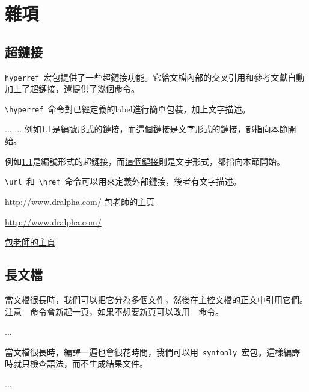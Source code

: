 \chapter{雜項}

\section{超鏈接}
\label{sec:hyperlink}

\verb|hyperref|~宏包\citep{Rahtz_2006}提供了一些超鏈接功能。它給文檔內部的交叉引用和參考文獻自動加上了超鏈接，還提供了幾個命令。

\verb|\hyperref|~命令對已經定義的label進行簡單包裝，加上文字描述。

\begin{code}
\usepackage{hyperref}
...
\label{sec:hyperlink}
...
例如\ref{sec:hyperlink}是編號形式的鏈接，而\hyperref[sec:hyperlink]{這個鏈接}是文字形式的鏈接，都指向本節開始。
\end{code}

\begin{out}
例如\ref{sec:hyperlink}是編號形式的超鏈接，而\hyperref[sec:hyperlink]{這個鏈接}則是文字形式，都指向本節開始。
\end{out}

\verb|\url|~和~\verb|\href|~命令可以用來定義外部鏈接，後者有文字描述。

\begin{code}
\url{http://www.dralpha.com/}
\href{http://www.dralpha.com/}{包老師的主頁}
\end{code}

\begin{out}
\url{http://www.dralpha.com/}

\href{http://www.dralpha.com/}{包老師的主頁}
\end{out}


\section{長文檔}
當文檔很長時，我們可以把它分為多個文件，然後在主控文檔的正文中引用它們。注意~\verb||~命令會新起一頁，如果不想要新頁可以改用~\verb||~命令。
\begin{code}



...

\end{code}

當文檔很長時，編譯一遍也會很花時間，我們可以用~\verb|syntonly|~宏包。這樣編譯時就只檢查語法，而不生成結果文件。
\begin{code}
\usepackage{syntonly}
...
\syntaxonly
\end{code}

